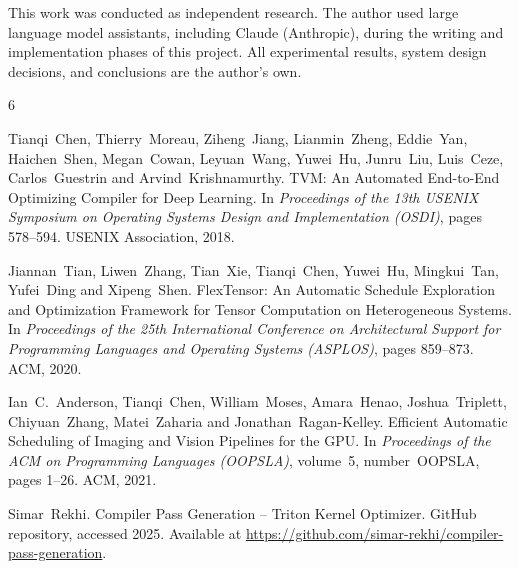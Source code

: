 \documentclass{article}
\begin{document}
This work was conducted as independent research. The author used large language model assistants, including Claude (Anthropic), during the writing and implementation phases of this project. All experimental results, system design decisions, and conclusions are the author's own.


\begin{thebibliography}{6}

Tianqi~Chen, Thierry~Moreau, Ziheng~Jiang, Lianmin~Zheng, Eddie~Yan,
Haichen~Shen, Megan~Cowan, Leyuan~Wang, Yuwei~Hu, Junru~Liu, Luis~Ceze,
Carlos~Guestrin and Arvind~Krishnamurthy.
\newblock TVM: An Automated End-to-End Optimizing Compiler for Deep Learning.
\newblock In \emph{Proceedings of the 13th USENIX Symposium on Operating Systems Design and Implementation (OSDI)}, pages 578--594. USENIX Association, 2018.

Jiannan~Tian, Liwen~Zhang, Tian~Xie, Tianqi~Chen, Yuwei~Hu, Mingkui~Tan, Yufei~Ding and Xipeng~Shen.
\newblock FlexTensor: An Automatic Schedule Exploration and Optimization Framework for Tensor Computation on Heterogeneous Systems.
\newblock In \emph{Proceedings of the 25th International Conference on Architectural Support for Programming Languages and Operating Systems (ASPLOS)}, pages 859--873. ACM, 2020.

Ian~C.~Anderson, Tianqi~Chen, William~Moses, Amara~Henao, Joshua~Triplett, Chiyuan~Zhang, Matei~Zaharia and Jonathan~Ragan-Kelley.
\newblock Efficient Automatic Scheduling of Imaging and Vision Pipelines for the GPU.
\newblock In \emph{Proceedings of the ACM on Programming Languages (OOPSLA)}, volume~5, number~OOPSLA, pages 1--26. ACM, 2021.

Simar~Rekhi.
\newblock Compiler Pass Generation -- Triton Kernel Optimizer.
\newblock GitHub repository, accessed 2025. Available at \url{https://github.com/simar-rekhi/compiler-pass-generation}.

\end{thebibliography}
\end{document}
